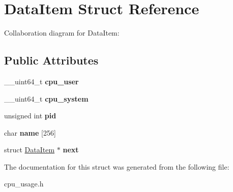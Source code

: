 \hypertarget{structDataItem}{}\section{Data\+Item Struct Reference}
\label{structDataItem}


Collaboration diagram for Data\+Item\+:
\subsection*{Public Attributes}
\begin{DoxyCompactItemize}
\item 
\+\_\+\+\_\+uint64\+\_\+t {\bfseries cpu\+\_\+user}\hypertarget{structDataItem_a5e2cc07e0d7711f64519c1b63af1eb43}{}\label{structDataItem_a5e2cc07e0d7711f64519c1b63af1eb43}

\item 
\+\_\+\+\_\+uint64\+\_\+t {\bfseries cpu\+\_\+system}\hypertarget{structDataItem_ada182fee65d2613d096b953d4571dfc6}{}\label{structDataItem_ada182fee65d2613d096b953d4571dfc6}

\item 
unsigned int {\bfseries pid}\hypertarget{structDataItem_a6c4898635656e7943f27ed8c61114853}{}\label{structDataItem_a6c4898635656e7943f27ed8c61114853}

\item 
char {\bfseries name} \mbox{[}256\mbox{]}\hypertarget{structDataItem_a224d6dea7d613ad5136a145ba12badb1}{}\label{structDataItem_a224d6dea7d613ad5136a145ba12badb1}

\item 
struct \hyperlink{structDataItem}{Data\+Item} $\ast$ {\bfseries next}\hypertarget{structDataItem_a1fc3b9871bd169601105d2d5ebaf8ed4}{}\label{structDataItem_a1fc3b9871bd169601105d2d5ebaf8ed4}

\end{DoxyCompactItemize}


The documentation for this struct was generated from the following file\+:\begin{DoxyCompactItemize}
\item 
cpu\+\_\+usage.\+h\end{DoxyCompactItemize}
